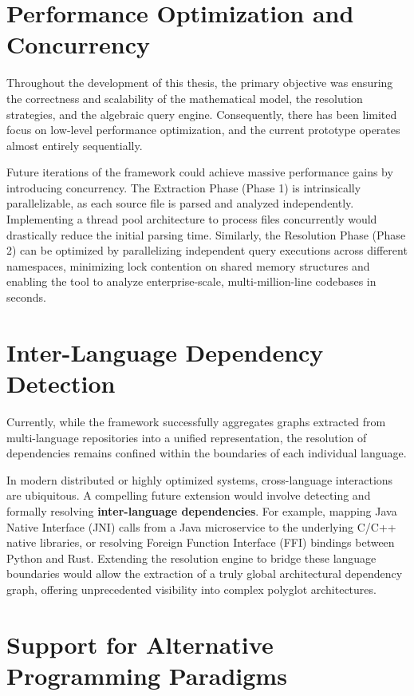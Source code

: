 \section{Performance Optimization and Concurrency}

Throughout the development of this thesis, the primary objective was
ensuring the correctness and scalability of the mathematical model,
the resolution strategies, and the algebraic query engine.
Consequently, there has been limited focus on low-level performance
optimization, and the current prototype operates almost entirely sequentially.

Future iterations of the framework could achieve massive performance
gains by introducing concurrency. The Extraction Phase (Phase 1) is
intrinsically parallelizable, as each source file is parsed and
analyzed independently. Implementing a thread pool architecture to
process files concurrently would drastically reduce the initial
parsing time. Similarly, the Resolution Phase (Phase 2) can be
optimized by parallelizing independent query executions across
different namespaces, minimizing lock contention on shared memory
structures and enabling the tool to analyze enterprise-scale,
multi-million-line codebases in seconds.

\section{Inter-Language Dependency Detection}

Currently, while the framework successfully aggregates graphs
extracted from multi-language repositories into a unified
representation, the resolution of dependencies remains confined
within the boundaries of each individual language.

In modern distributed or highly optimized systems, cross-language
interactions are ubiquitous. A compelling future extension would
involve detecting and formally resolving \textbf{inter-language
dependencies}. For example, mapping Java Native Interface (JNI) calls
from a Java microservice to the underlying C/C++ native libraries, or
resolving Foreign Function Interface (FFI) bindings between Python
and Rust. Extending the resolution engine to bridge these language
boundaries would allow the extraction of a truly global architectural
dependency graph, offering unprecedented visibility into complex
polyglot architectures.

\section{Support for Alternative Programming Paradigms}

